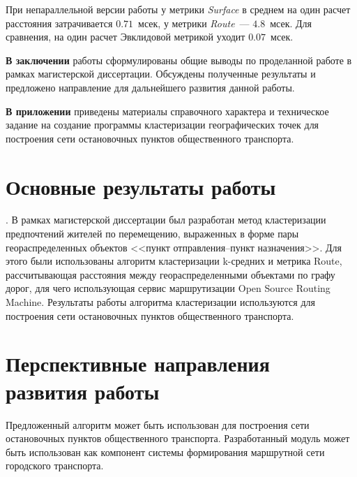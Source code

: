 При непараллельной версии работы у метрики \emph{Surface} в среднем на один расчет расстояния затрачивается \( 0.71 \)~мсек, у метрики \emph{Route}~--- \( 4.8 \)~мсек. Для сравнения, на один расчет Эвклидовой метрикой уходит \( 0.07 \)~мсек.

\textbf{В заключении} работы сформулированы общие выводы по проделанной работе в рамках магистерской диссертации. Обсуждены полученные результаты и предложено направление для дальнейшего развития данной работы.

\textbf{В приложении} приведены материалы справочного характера и техническое задание на создание программы кластеризации географических точек для построения сети остановочных пунктов общественного транспорта.

\section{Основные результаты работы}. В рамках магистерской диссертации был разработан метод кластеризации предпочтений жителей по перемещению, выраженных в форме пары геораспределенных объектов <<пункт отправления--пункт назначения>>. Для этого были использованы алгоритм кластеризации k-средних и метрика Route, рассчитывающая расстояния между геораспределенными объектами по графу дорог, для чего использующая сервис маршрутизации Open Source Routing Machine. Результаты работы алгоритма кластеризации используются для построения сети остановочных пунктов общественного транспорта.

\section{Перспективные направления развития работы}
Предложенный алгоритм может быть использован для построения сети остановочных пунктов общественного транспорта.
Разработанный модуль может быть использован как компонент системы формирования маршрутной сети городского транспорта.

